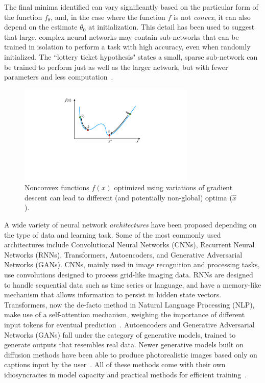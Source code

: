 The final minima identified 
can vary significantly based on 
the particular form of the function $f_\theta$, 
and, in the case where the function $f$ is not \textit{convex}, 
it can also depend on the estimate $\theta_0$ at initialization.
This detail has been used to suggest
that large, complex neural networks 
may contain sub-networks that can be trained in isolation
to perform a task with high accuracy,
even when randomly initialized.
The ``lottery ticket hypothesis" states 
a small, sparse sub-network can be trained to perform just as well as the larger network, 
but with fewer parameters and less computation~\citep{frankle2018the}.
\begin{figure}
	\centering
	\includegraphics[width=0.75\textwidth,trim={15cm 15cm 15cm 1cm},clip]{2_bknd/localmin.pdf}
	\caption[Importance of initialization in nonconvex problems]{Nonconvex functions $f(x)$ optimized using variations of gradient descent can lead to different (and potentially non-global) optima ($\hat{x}$).}
	\label{fig:localmin}
\end{figure}

A wide variety of neural network \textit{architectures}
have been proposed depending on the type of data and learning task.
Some of the most commonly used architectures include
Convolutional Neural Networks (CNNs), Recurrent Neural Networks (RNNs),
Transformers, Autoencoders, and Generative Adversarial Networks (GANs).
CNNs, mainly used in image recognition and processing tasks,
use convolutions designed to process grid-like imaging data. 
RNNs are designed to handle sequential data such as time series or language,
and have a memory-like mechanism that allows information to persist in hidden state vectors. 
Transformers, now the de-facto method in Natural Language Processing (NLP),
make use of a self-attention mechanism,
weighing the importance of different input tokens for eventual prediction~\citep{vaswani2017attention}. 
Autoencoders and Generative Adversarial Networks (GANs) fall under the category of generative models,
trained to generate outputs that resembles real data. 
Newer generative models built on diffusion methods have 
been able to produce photorealistic images based
only on captions input by the user~\citep{rombach2022high}.
All of these methods come with their own
idiosyncracies in model capacity and practical
methods for efficient training~\citep{lecun2015deep}.

